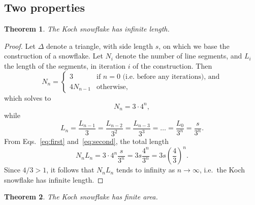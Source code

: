 \documentclass[12pt, a4paper]{article}
\newcommand{\uberfrac}[1]{
	= \frac {L_{n - #1}} {3^#1}
}
\newtheorem{theorem}{Theorem}
\begin{document}
\subsection{Two properties}
\begin{theorem}
	The Koch snowflake has infinite length.
\end{theorem}
\begin{proof}
Let $\Delta$ denote a triangle, with side length $s$, on which
we base the construction of a snowflake. Let $N_i$ denote the number of line
segments, and $L_i$ the length of the segments, in iteration $i$ of the
construction. Then%
$$%
	N_n =
	\begin{cases}
		3 &\text{if } n = 0 \text{ (i.e.\ before any iterations), and} \\
		4N_{n-1} &\text{otherwise,}
	\end{cases}
$$%
which solves to
\begin{equation} \label{eq:first}
	N_n = 3 \cdot 4^n,
\end{equation}
while
\begin{equation}\label{eq:second}
	L_n = \frac {L_{n-1}} {3} \uberfrac{2} \uberfrac{3} = \ldots =
		\frac{L_0} {3^n} = \frac s {3^n}.
\end{equation}
From Eqs.~\ref{eq:first} and~\ref{eq:second}, the total length
$$
	N_nL_n = 3 \cdot 4^n \frac s {3^n} = 3s \frac {4^n} {3^n} = 3s \left (
		\frac 4 3
	\right )^n.
$$
Since $4/3 > 1$, it follows that $N_nL_n$ tends to infinity as
$n \to \infty$, i.e.\ the Koch snowflake has infinite length.
\end{proof}
\begin{theorem}
	The Koch snowflake has finite area.
\end{theorem}
\end{document}
